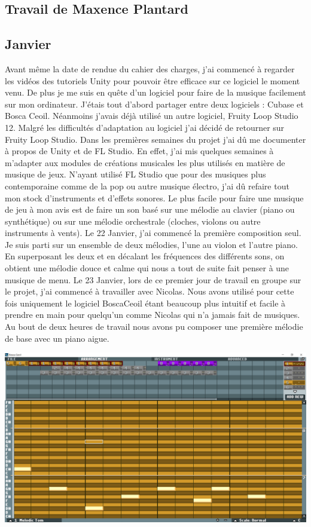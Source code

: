 \documentclass[]{extarticle}
\begin{document}
\begin{spacing}{1.25}
\section{Travail de Maxence Plantard}

\subsection{Janvier}
\bigbreak
\bigbreak
Avant même la date de rendue du cahier des charges, j’ai commencé à regarder les vidéos des tutoriels Unity pour pouvoir être efficace sur ce logiciel le moment venu.
\bigbreak
De plus je me suis en quête d’un logiciel pour faire de la musique facilement sur mon ordinateur. J’étais tout d’abord partager entre deux logiciels : Cubase et Bosca Ceoil. Néanmoins j’avais déjà utilisé un autre logiciel, Fruity Loop Studio 12. Malgré les difficultés d’adaptation au logiciel j’ai décidé de retourner sur Fruity Loop Studio.
\bigbreak
Dans les premières semaines du projet j’ai dû me documenter à propos de Unity et de FL Studio. En effet, j’ai mis quelques semaines à m’adapter aux modules de créations musicales les plus utilisés en matière de musique de jeux. N’ayant utilisé FL Studio que pour des musiques plus contemporaine comme de la pop ou autre musique électro, j’ai dû refaire tout mon stock d’instruments et d’effets sonores. Le plus facile pour faire une musique de jeu à mon avis est de faire un son basé sur une mélodie au clavier (piano ou synthétique) ou sur une mélodie orchestrale (cloches, violons ou autre instruments à vents).
\bigbreak
\bigbreak
\bigbreak
Le 22 Janvier, j’ai commencé la première composition seul. Je suis parti sur un ensemble de deux mélodies, l’une au violon et l’autre piano. En superposant les deux et en décalant les fréquences des différents sons, on obtient une mélodie douce et calme qui nous a tout de suite fait penser à une musique de menu. 
\newpage
Le 23 Janvier, lors de ce premier jour de travail en groupe sur le projet, j’ai commencé à travailler avec Nicolas. Nous avons utilisé pour cette fois uniquement le logiciel BoscaCeoil étant beaucoup plus intuitif et facile à prendre en main pour quelqu’un comme Nicolas qui n’a jamais fait de musiques. Au bout de deux heures de travail nous avons pu composer une première mélodie de base avec un piano aigue.
\bigbreak
\bigbreak
\begin{center}
\includegraphics[scale = 0.18]{ceoil.png}

\end{center}
\end{spacing}
\end{document}

